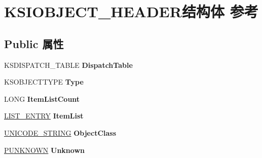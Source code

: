\hypertarget{struct_k_s_i_o_b_j_e_c_t___h_e_a_d_e_r}{}\section{K\+S\+I\+O\+B\+J\+E\+C\+T\+\_\+\+H\+E\+A\+D\+E\+R结构体 参考}
\label{struct_k_s_i_o_b_j_e_c_t___h_e_a_d_e_r}
\subsection*{Public 属性}
\begin{DoxyCompactItemize}
\item 
\mbox{\label{struct_k_s_i_o_b_j_e_c_t___h_e_a_d_e_r_a54d2144dee1afabc1dd77ad97fa67c4e}} 
K\+S\+D\+I\+S\+P\+A\+T\+C\+H\+\_\+\+T\+A\+B\+LE {\bfseries Dispatch\+Table}
\item 
\mbox{\label{struct_k_s_i_o_b_j_e_c_t___h_e_a_d_e_r_aebc996cb0819ebde44c04fd95e9d8920}} 
K\+S\+O\+B\+J\+E\+C\+T\+T\+Y\+PE {\bfseries Type}
\item 
\mbox{\label{struct_k_s_i_o_b_j_e_c_t___h_e_a_d_e_r_a85cb9801974d70490dfb4decef82dfb1}} 
L\+O\+NG {\bfseries Item\+List\+Count}
\item 
\mbox{\label{struct_k_s_i_o_b_j_e_c_t___h_e_a_d_e_r_ab043038c51a64480af0fa7e1a892a261}} 
\hyperlink{struct___l_i_s_t___e_n_t_r_y}{L\+I\+S\+T\+\_\+\+E\+N\+T\+RY} {\bfseries Item\+List}
\item 
\mbox{\label{struct_k_s_i_o_b_j_e_c_t___h_e_a_d_e_r_acc75a5ff06873da3331b11ba493003db}} 
\hyperlink{struct___u_n_i_c_o_d_e___s_t_r_i_n_g}{U\+N\+I\+C\+O\+D\+E\+\_\+\+S\+T\+R\+I\+NG} {\bfseries Object\+Class}
\item 
\mbox{\label{struct_k_s_i_o_b_j_e_c_t___h_e_a_d_e_r_af4d1ee230846d08b0b8b7b62db294992}} 
\hyperlink{interface_i_unknown}{P\+U\+N\+K\+N\+O\+WN} {\bfseries Unknown}
\item 
\mbox{\label{struct_k_s_i_o_b_j_e_c_t___h_e_a_d_e_r_aaf98e9c6d8d57f08221399aa2e8a91d8}} 

\end{DoxyCompactItemize}
